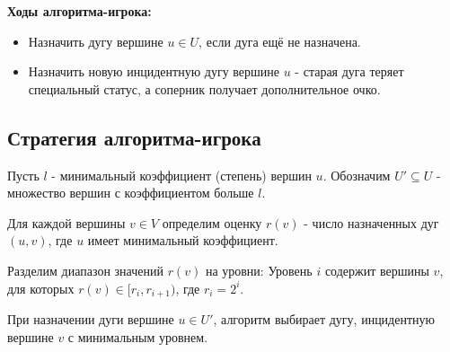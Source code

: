 {\textbf{Ходы алгоритма-игрока:}
\begin{itemize}
  \item Назначить дугу вершине $u \in U$, если дуга ещё не назначена.
  \item Назначить новую инцидентную дугу вершине $u$ - старая дуга теряет специальный статус, а соперник получает дополнительное очко.
\end{itemize}

\subsection*{Стратегия алгоритма-игрока}

Пусть $l$ - минимальный коэффициент (степень) вершин $u$.  
Обозначим $U' \subseteq U$ - множество вершин с коэффициентом больше $l$.

Для каждой вершины $v \in V$ определим оценку $r(v)$ - число назначенных дуг $(u, v)$, где $u$ имеет минимальный коэффициент.

Разделим диапазон значений $r(v)$ на уровни:  
Уровень $i$ содержит вершины $v$, для которых $r(v) \in [r_i, r_{i+1})$, где $r_i = 2^i$.

При назначении дуги вершине $u \in U'$, алгоритм выбирает дугу, инцидентную вершине $v$ с минимальным уровнем.





    \newpage
}
